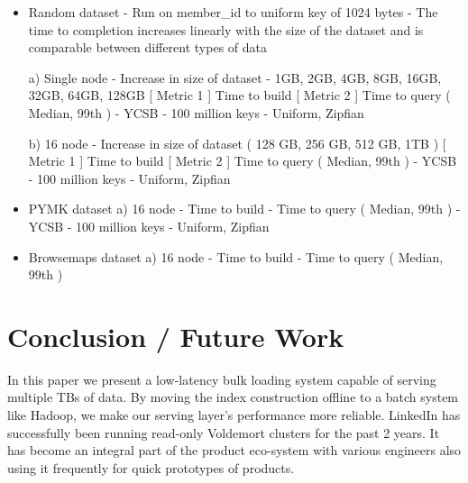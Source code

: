 \documentclass[10pt,twocolumn,preprint,natbib,authoryear]{sigplanconf}
\begin{document}
\begin{itemize}
	\item Random dataset
- Run on member\_id to uniform key of 1024 bytes
- The time to completion increases linearly with the size of the dataset and is comparable between different types of data

a) Single node - Increase in size of dataset - 1GB, 2GB, 4GB, 8GB, 16GB, 32GB, 64GB, 128GB 
       [ Metric 1 ] Time to build
       [ Metric 2 ] Time to query ( Median, 99th ) - YCSB - 100 million keys - Uniform, Zipfian 

b) 16 node - Increase in size of dataset ( 128 GB, 256 GB, 512 GB, 1TB )
      [ Metric 1 ] Time to build
      [ Metric 2 ] Time to query ( Median, 99th ) - YCSB - 100 million keys - Uniform, Zipfian 

	\item PYMK dataset
	a) 16 node 
       - Time to build
       - Time to query ( Median, 99th ) - YCSB - 100 million keys - Uniform, Zipfian 

	\item Browsemaps dataset
	a) 16 node
	   - Time to build
	   - Time to query ( Median, 99th )
\end{itemize}


\section{Conclusion / Future Work}
In this paper we present a low-latency bulk loading system capable of serving multiple TBs of data. By moving the index construction offline to a batch system like Hadoop, we make our serving layer's performance more reliable. LinkedIn has successfully been running read-only Voldemort clusters for the past 2 years. It has become an integral part of the product eco-system with various engineers also using it frequently for quick prototypes of products. 
\end{document}
